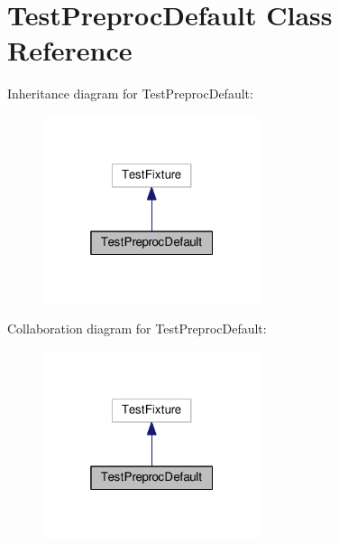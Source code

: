 \hypertarget{class_test_preproc_default}{}\section{Test\+Preproc\+Default Class Reference}
\label{class_test_preproc_default}


Inheritance diagram for Test\+Preproc\+Default\+:
\nopagebreak
\begin{figure}[H]
\begin{center}
\leavevmode
\includegraphics[width=181pt]{class_test_preproc_default__inherit__graph}
\end{center}
\end{figure}


Collaboration diagram for Test\+Preproc\+Default\+:
\nopagebreak
\begin{figure}[H]
\begin{center}
\leavevmode
\includegraphics[width=181pt]{class_test_preproc_default__coll__graph}
\end{center}
\end{figure}
